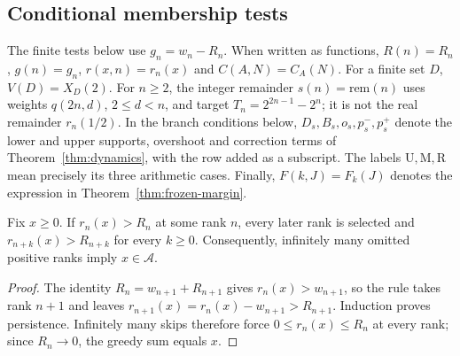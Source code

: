 \subsection{Conditional membership tests}

The finite tests below use $g_n=w_n-R_n$.  When written as functions,
$R(n)=R_n$, $g(n)=g_n$, $r(x,n)=r_n(x)$ and $C(A,N)=C_A(N)$.
For a finite set $D$, $V(D)=X_D(2)$.  For $n\ge2$, the integer remainder
$s(n)=\mathrm{rem}(n)$ uses weights $q(2n,d)$, $2\le d<n$, and
target $T_n=2^{2n-1}-2^n$; it is not the real remainder $r_n(1/2)$.
In the branch conditions below, $D_s,B_s,o_s,p_s^-,p_s^+$ denote the
lower and upper supports, overshoot and correction terms of
Theorem~\ref{thm:dynamics}, with the row added as a subscript.
The labels $\mathrm U,\mathrm M,\mathrm R$ mean precisely its three
arithmetic cases.  Finally, $F(k,J)=F_k(J)$ denotes the expression in
Theorem~\ref{thm:frozen-margin}.



\begin{thm}
\label{thm:fatal-absorbing}
Fix $x\ge0$.  If $r_n(x)>R_n$ at some rank $n$, every later
rank is selected and $r_{n+k}(x)>R_{n+k}$ for every $k\ge0$.
Consequently, infinitely many omitted positive ranks imply
$x\in\mathcal A$.
\end{thm}
\begin{proof}
The identity $R_n=w_{n+1}+R_{n+1}$ gives
$r_n(x)>w_{n+1}$, so the rule takes rank $n+1$ and leaves
$r_{n+1}(x)=r_n(x)-w_{n+1}>R_{n+1}$.  Induction proves persistence.
Infinitely many skips therefore force $0\le r_n(x)\le R_n$ at
every rank; since $R_n\to0$, the greedy sum equals $x$.
\end{proof}

